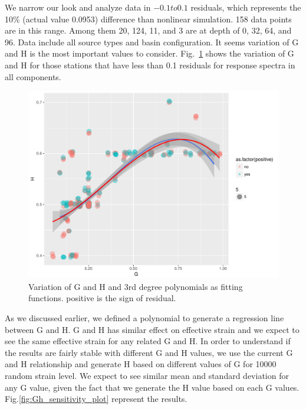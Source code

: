 We narrow our look and analyze data in $-0.1 to 0.1$ residuals, which represents the 10\% (actual value 0.0953) difference than nonlinear simulation. 158 data points are in this range. Among them 20, 124, 11, and 3 are at depth of 0, 32, 64, and 96. Data include all source types and basin configuration.  It seems variation of G and H is the most important values to consider. Fig.~\ref{fig:variation_G_H} shows the variation of G and H for those stations that have less than 0.1 residuals for response spectra in all components. 

 \begin{figure}[H]
    \centering
    \includegraphics[width=\textwidth]{figures/pdf/variation_G_H.pdf}
    \caption{Variation of G and H and 3rd degree polynomials as fitting functions. positive is the sign of residual.}
    \label{fig:variation_G_H}
\end{figure}

As we discussed earlier, we defined a polynomial to generate a regression line between G and H. G and H has similar effect on effective strain and we expect to see the same effective strain for any related G and H. In order to understand if the results are fairly stable with different G and H values, we use the current G and H relationship and generate H based on different values of G for 10000 random strain level. We expect to see similar mean and standard deviation for any G value, given the fact that we generate the H value based on each G values. Fig.\ref{fig:Gh_sensitivity_plot} represent the results. 

